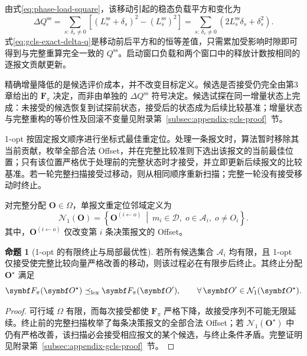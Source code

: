 \documentclass[UTF8,a4paper,twoside,zihao=-4]{ctexart}
\numberwithin{equation}{section}
\numberwithin{figure}{section}
\numberwithin{table}{section}
\theoremstyle{definition}
\newtheorem{proposition}{命题}
\newcommand{\Oset}{\mathcal{A}}
\numberwithin{algocf}{section}
\begin{document}
由式\eqref{eq:phase-load-square}，该移动引起的稳态负载平方和变化为
\begin{equation}
 \Delta Q^{\mathrm{ss}}
 =
 \sum_{s:\,\delta_s\ne0}
 \left[
  \left(L_s^{\mathrm{ss}}+\delta_s\right)^2
  -
  \left(L_s^{\mathrm{ss}}\right)^2
 \right]
 =
 \sum_{s:\,\delta_s\ne0}
 \left(
  2L_s^{\mathrm{ss}}\delta_s+\delta_s^2
 \right).
\label{eq:gcls-exact-delta-q}
\end{equation}
式\eqref{eq:gcls-exact-delta-q}是移动前后平方和的恒等差值，只需累加受影响时隙即可得到与完整重算完全一致的 $Q^{\mathrm{ss}}$。启动窗口负载和两个窗口中的释放计数按相同的逐报文贡献更新。

精确增量降低的是候选评价成本，并不改变目标定义。候选是否接受仍完全由第3章给出的 $\symbf F_{\pi}$ 决定，而非由单独的 $\Delta Q^{\mathrm{ss}}$ 符号决定。候选试探在同一增量状态上完成：未接受的候选恢复到试探前状态，接受后的状态成为后续比较基准；增量状态与完整重构的等价性及回滚不变量见附录第~\ref{subsec:appendix-gcls-proof}~节。

1-opt 按固定报文顺序进行坐标式最佳重定位。处理一条报文时，算法暂时移除其当前贡献，枚举全部合法 Offset，并在完整比较准则下选出该报文的当前最佳位置；只有该位置严格优于处理前的完整状态时才接受，并立即更新后续报文的比较基准。若一轮完整扫描接受过移动，则从相同顺序重新扫描；完整一轮没有接受移动时终止。

对完整分配 $\symbf O\in\Omega$，单报文重定位邻域定义为
\begin{equation}
 \mathcal N_1(\symbf O)
 =
 \left\{
  \symbf O^{(i\leftarrow o)}
  \ \middle|\
  m_i\in\mathcal D,\;
  o\in\Oset_i,\;
  o\ne O_i
 \right\}.
\label{eq:gcls-one-neighborhood}
\end{equation}
其中，$\symbf O^{(i\leftarrow o)}$ 仅改变第 $i$ 条决策报文的 Offset。

\begin{proposition}[1-opt 的有限终止与局部最优性]
\label{prop:gcls-one-opt}
若所有候选集合 $\Oset_i$ 均有限，且 1-opt 仅接受使完整比较向量严格改善的移动，则该过程必在有限步后终止。其终止分配 $\symbf O^\star$ 满足
\begin{equation}
 \symbf F_{\pi}(\symbf O^\star)
 \preceq_{\rm lex}
 \symbf F_{\pi}(\symbf O'),
 \qquad
 \forall\,\symbf O'\in\mathcal N_1(\symbf O^\star).
\label{eq:gcls-one-local-optimum}
\end{equation}
\end{proposition}

\begin{proof}
可行域 $\Omega$ 有限，而每次接受都使 $\symbf F_{\pi}$ 严格下降，故接受序列不可能无限延续。终止前的完整扫描枚举了每条决策报文的全部合法 Offset；若 $\mathcal N_1(\symbf O^\star)$ 中仍有严格改善，该扫描必会接受相应报文的某个候选，与终止条件矛盾。完整证明见附录第~\ref{subsec:appendix-gcls-proof}~节。
\end{proof}
\end{document}
